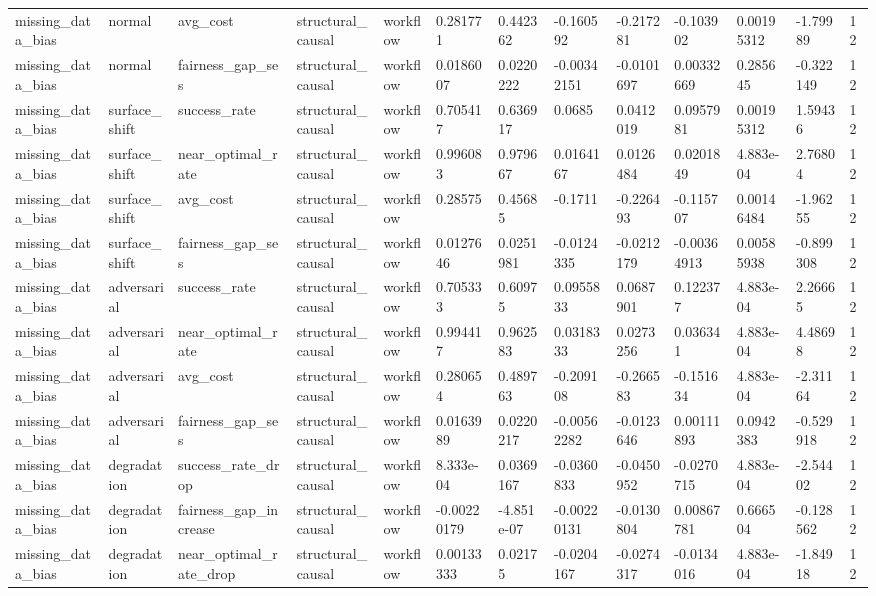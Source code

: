 \begin{tabular}{lllllllllllll}
missing\_data\_bias & normal & avg\_cost & structural\_causal & workflow & 0.281771 & 0.442362 & -0.160592 & -0.217281 & -0.103902 & 0.00195312 & -1.79989 & 12 \\
missing\_data\_bias & normal & fairness\_gap\_ses & structural\_causal & workflow & 0.0186007 & 0.0220222 & -0.00342151 & -0.0101697 & 0.00332669 & 0.285645 & -0.322149 & 12 \\
missing\_data\_bias & surface\_shift & success\_rate & structural\_causal & workflow & 0.705417 & 0.636917 & 0.0685 & 0.0412019 & 0.0957981 & 0.00195312 & 1.59436 & 12 \\
missing\_data\_bias & surface\_shift & near\_optimal\_rate & structural\_causal & workflow & 0.996083 & 0.979667 & 0.0164167 & 0.0126484 & 0.0201849 & 4.883e-04 & 2.76804 & 12 \\
missing\_data\_bias & surface\_shift & avg\_cost & structural\_causal & workflow & 0.28575 & 0.45685 & -0.1711 & -0.226493 & -0.115707 & 0.00146484 & -1.96255 & 12 \\
missing\_data\_bias & surface\_shift & fairness\_gap\_ses & structural\_causal & workflow & 0.0127646 & 0.0251981 & -0.0124335 & -0.0212179 & -0.00364913 & 0.00585938 & -0.899308 & 12 \\
missing\_data\_bias & adversarial & success\_rate & structural\_causal & workflow & 0.705333 & 0.60975 & 0.0955833 & 0.0687901 & 0.122377 & 4.883e-04 & 2.26665 & 12 \\
missing\_data\_bias & adversarial & near\_optimal\_rate & structural\_causal & workflow & 0.994417 & 0.962583 & 0.0318333 & 0.0273256 & 0.036341 & 4.883e-04 & 4.48698 & 12 \\
missing\_data\_bias & adversarial & avg\_cost & structural\_causal & workflow & 0.280654 & 0.489763 & -0.209108 & -0.266583 & -0.151634 & 4.883e-04 & -2.31164 & 12 \\
missing\_data\_bias & adversarial & fairness\_gap\_ses & structural\_causal & workflow & 0.0163989 & 0.0220217 & -0.00562282 & -0.0123646 & 0.00111893 & 0.0942383 & -0.529918 & 12 \\
missing\_data\_bias & degradation & success\_rate\_drop & structural\_causal & workflow & 8.333e-04 & 0.0369167 & -0.0360833 & -0.0450952 & -0.0270715 & 4.883e-04 & -2.54402 & 12 \\
missing\_data\_bias & degradation & fairness\_gap\_increase & structural\_causal & workflow & -0.00220179 & -4.851e-07 & -0.00220131 & -0.0130804 & 0.00867781 & 0.666504 & -0.128562 & 12 \\
missing\_data\_bias & degradation & near\_optimal\_rate\_drop & structural\_causal & workflow & 0.00133333 & 0.02175 & -0.0204167 & -0.0274317 & -0.0134016 & 4.883e-04 & -1.84918 & 12 \\

\end{tabular}
